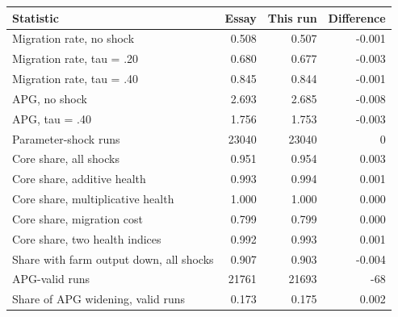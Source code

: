 \begin{tabular}{lrrr}
\hline
Statistic & Essay & This run & Difference \\
\hline
Migration rate, no shock & 0.508 & 0.507 & -0.001 \\
Migration rate, tau = .20 & 0.680 & 0.677 & -0.003 \\
Migration rate, tau = .40 & 0.845 & 0.844 & -0.001 \\
APG, no shock & 2.693 & 2.685 & -0.008 \\
APG, tau = .40 & 1.756 & 1.753 & -0.003 \\
Parameter-shock runs & 23040 & 23040 & 0 \\
Core share, all shocks & 0.951 & 0.954 & 0.003 \\
Core share, additive health & 0.993 & 0.994 & 0.001 \\
Core share, multiplicative health & 1.000 & 1.000 & 0.000 \\
Core share, migration cost & 0.799 & 0.799 & 0.000 \\
Core share, two health indices & 0.992 & 0.993 & 0.001 \\
Share with farm output down, all shocks & 0.907 & 0.903 & -0.004 \\
APG-valid runs & 21761 & 21693 & -68 \\
Share of APG widening, valid runs & 0.173 & 0.175 & 0.002 \\
\hline
\end{tabular}
